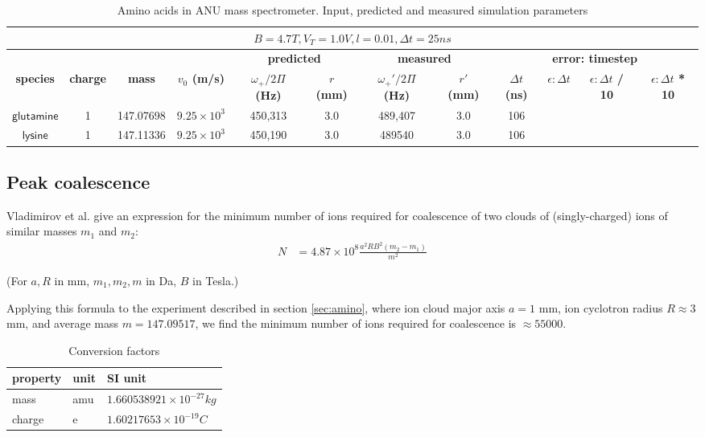 \documentclass[10pt,conference,onecolumn]{IEEEtran}
\begin{document}
\begin{table}[htbp]
 \centering	  	  
 \caption{Amino acids in ANU mass spectrometer. Input, predicted and measured simulation parameters}
\label{tab:amino}
\begin{tabular}{c|c|c|c|c|c|c|c|c|c|c|c}
 \hline \hline
  \multicolumn{12}{|c|}{$B = 4.7 T, V_T = 1.0 V, l = 0.01, \Delta t = 25ns$} \\
 \hline \hline
 \multicolumn{4}{|c|}{ } & \multicolumn{2}{|c|}{\textbf{predicted}} & \multicolumn{2}{|c|}{\textbf{measured}} & \multicolumn{4}{|c|}{\textbf{error: timestep}} \\ 
 \hline
 \textbf{species} & \textbf{charge} & \textbf{mass} & \textbf{$v_0$ (m/s)} & \textbf{$\omega_+ / 2\Pi$ (Hz)} & \textbf{$r$ (mm)} & \textbf{$\omega_+' / 2\Pi$ (Hz)}  & \textbf{$r'$ (mm)} & \textbf{$\Delta t$ (ns)} & \textbf{$\epsilon: \Delta t$}& \textbf{$\epsilon: \Delta t$ / 10} & \textbf{$\epsilon: \Delta t$ * 10}\\ 
 \hline
 $\mathsf{glutamine}$ & 1 & 147.07698 & $9.25 \times 10^3$ & 450,313 & 3.0 & 489,407 & 3.0 & 106 & \\
 $\mathsf{lysine}$ & 1 & 147.11336 & $9.25 \times 10^3$ & 450,190 & 3.0 & 489540 & 3.0 & 106 & \\
 \hline \hline
\end{tabular}
\end{table}

\subsection{Peak coalescence}

Vladimirov et al.\cite{Vladimirov2011} give an expression for the minimum number of ions required for coalescence of two clouds of (singly-charged) ions of similar masses $m_1$ and $m_2$:
\begin{align}
N &= 4.87 \times 10^8 \frac{a^2 R B^2 (m_2 - m_1)}{m^2}
\end{align}

(For $a,R$ in mm, $m_1 ,m_2, m$ in Da, $B$ in Tesla.)

Applying this formula to the experiment described in section \ref{sec:amino}, where ion cloud major axis $a = 1$ mm, ion cyclotron radius $R \approx 3$ mm, and average mass $m = 147.09517$, we find the minimum number of ions required for coalescence is $\approx 55000$.

\begin{table}[htbp]
 \centering	  	  
 \caption{Conversion factors}
\label{tab:conversion}
\begin{tabular}{l|l|l}
\hline \hline
\textbf{property} & \textbf{unit} & \textbf{SI unit} \\
\hline
mass & amu & $1.660538921 \times 10^{ - 27} kg$ \\
charge & e   & $1.60217653 \times 10^{ - 19} C$ \\
\hline \hline
\end{tabular}
\end{table}



\end{document}
